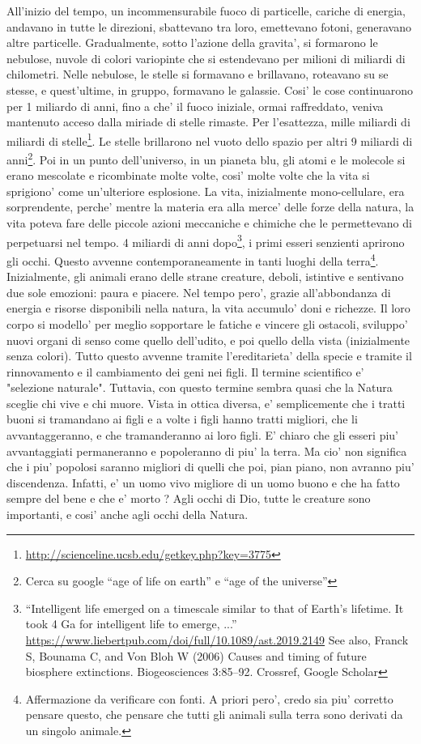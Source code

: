 {All'inizio del tempo, un incommensurabile fuoco di particelle, cariche di energia, andavano in tutte le direzioni, sbattevano tra loro, emettevano fotoni, generavano altre particelle.
Gradualmente, sotto l'azione della gravita', si formarono le nebulose, nuvole di colori variopinte che si estendevano per milioni di miliardi di chilometri.
Nelle nebulose, le stelle si formavano e brillavano, roteavano su se stesse, e quest'ultime, in gruppo, formavano le galassie.
  Cosi' le cose continuarono per 1 miliardo di anni, fino a che' il fuoco iniziale, ormai raffreddato, veniva mantenuto acceso dalla miriade di stelle rimaste. Per l'esattezza, mille miliardi di miliardi di stelle\footnote{\url{http://scienceline.ucsb.edu/getkey.php?key=3775}}. 
  Le stelle brillarono nel vuoto dello spazio per altri 9 miliardi di anni\footnote{Cerca su google ``age of life on earth'' e ``age of the universe''}. Poi in un punto dell'universo, in un pianeta blu, gli atomi e le molecole si erano mescolate e ricombinate molte volte, cosi' molte volte che la vita si sprigiono' come un'ulteriore esplosione. La vita, inizialmente mono-cellulare, era sorprendente, perche' mentre la materia era alla merce' delle forze della natura, la vita poteva fare delle piccole azioni meccaniche e chimiche che le permettevano di perpetuarsi nel tempo.
 4 miliardi di anni dopo\footnote{``Intelligent life emerged on a timescale similar to that of Earth's lifetime. It took 4 Ga for intelligent life to emerge, ...''
    \url{https://www.liebertpub.com/doi/full/10.1089/ast.2019.2149}  See also, Franck S, Bounama C, and Von Bloh W (2006) Causes and timing of future biosphere extinctions. Biogeosciences 3:85–92. Crossref, Google Scholar}, i primi esseri senzienti aprirono gli occhi. Questo avvenne contemporaneamente in tanti luoghi della terra\footnote{Affermazione da verificare con fonti. A priori pero', credo sia piu' corretto pensare questo, che pensare che tutti gli animali sulla terra sono derivati da un singolo animale.}. Inizialmente, gli animali erano delle strane creature, deboli, istintive e sentivano due sole emozioni: paura e piacere. Nel tempo pero', grazie all'abbondanza di energia e risorse disponibili nella natura, la vita accumulo' doni e richezze. Il loro corpo si modello' per meglio sopportare le fatiche e vincere gli ostacoli, sviluppo' nuovi organi di senso come quello dell'udito, e poi quello della vista (inizialmente senza colori). Tutto questo avvenne tramite l'ereditarieta' della specie e tramite il rinnovamento e il cambiamento dei geni nei figli.
Il termine scientifico e' "selezione naturale". Tuttavia, con questo termine sembra quasi che la Natura sceglie chi vive e chi muore. Vista in ottica diversa, e' semplicemente che i tratti buoni si tramandano ai figli e a volte i figli hanno tratti migliori, che li avvantaggeranno, e che tramanderanno ai loro figli. E' chiaro che gli esseri piu' avvantaggiati permaneranno e popoleranno di piu' la terra. Ma cio' non significa che i piu' popolosi saranno migliori di quelli che poi, pian piano, non avranno piu' discendenza. Infatti, e' un uomo vivo migliore di un uomo buono e che ha fatto sempre del bene e che e' morto ? Agli occhi di Dio, tutte le creature sono importanti, e cosi' anche agli occhi della Natura.

}
